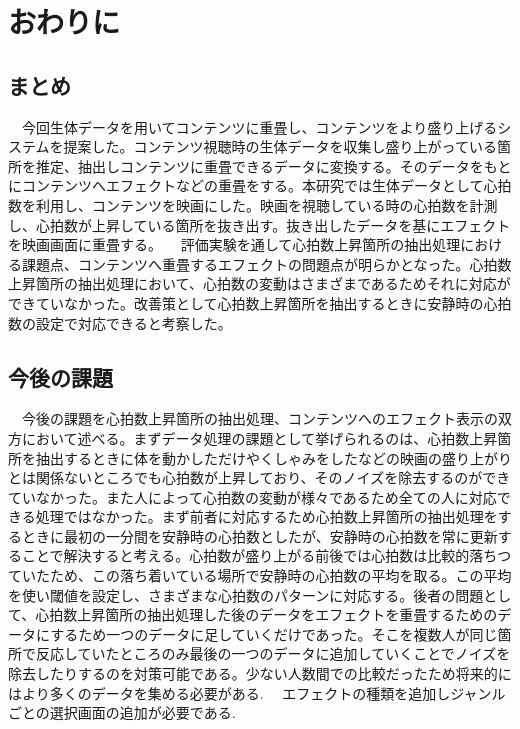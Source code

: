 \chapter{おわりに}

\section{まとめ}
　今回生体データを用いてコンテンツに重畳し、コンテンツをより盛り上げるシステムを提案した。コンテンツ視聴時の生体データを収集し盛り上がっている箇所を推定、抽出しコンテンツに重畳できるデータに変換する。そのデータをもとにコンテンツへエフェクトなどの重畳をする。本研究では生体データとして心拍数を利用し、コンテンツを映画にした。映画を視聴している時の心拍数を計測し、心拍数が上昇している箇所を抜き出す。抜き出したデータを基にエフェクトを映画画面に重畳する。
　評価実験を通して心拍数上昇箇所の抽出処理における課題点、コンテンツへ重畳するエフェクトの問題点が明らかとなった。心拍数上昇箇所の抽出処理において、心拍数の変動はさまざまであるためそれに対応ができていなかった。改善策として心拍数上昇箇所を抽出するときに安静時の心拍数の設定で対応できると考察した。
　

\section{今後の課題}
　今後の課題を心拍数上昇箇所の抽出処理、コンテンツへのエフェクト表示の双方において述べる。まずデータ処理の課題として挙げられるのは、心拍数上昇箇所を抽出するときに体を動かしただけやくしゃみをしたなどの映画の盛り上がりとは関係ないところでも心拍数が上昇しており、そのノイズを除去するのができていなかった。また人によって心拍数の変動が様々であるため全ての人に対応できる処理ではなかった。まず前者に対応するため心拍数上昇箇所の抽出処理をするときに最初の一分間を安静時の心拍数としたが、安静時の心拍数を常に更新することで解決すると考える。心拍数が盛り上がる前後では心拍数は比較的落ちつていたため、この落ち着いている場所で安静時の心拍数の平均を取る。この平均を使い閾値を設定し、さまざまな心拍数のパターンに対応する。後者の問題として、心拍数上昇箇所の抽出処理した後のデータをエフェクトを重畳するためのデータにするため一つのデータに足していくだけであった。そこを複数人が同じ箇所で反応していたところのみ最後の一つのデータに追加していくことでノイズを除去したりするのを対策可能である。少ない人数間での比較だったため将来的にはより多くのデータを集める必要がある.
　エフェクトの種類を追加しジャンルごとの選択画面の追加が必要である. 
